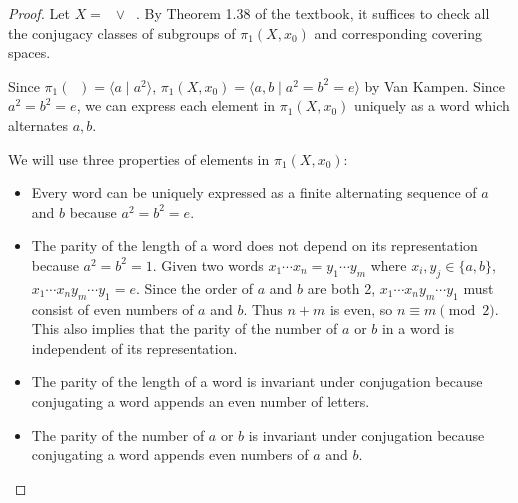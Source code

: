 \documentclass[12pt, psamsfonts]{amsart}
\theoremstyle{definition}
\theoremstyle{remark}
\DeclareMathOperator{\RP}{\mathbb{R}\mathbf{P}^2}
\numberwithin{equation}{section}
\begin{document}
\begin{proof}
  Let $X = \RP \vee \RP$.
  By Theorem 1.38 of the textbook, it suffices to check all the conjugacy classes of subgroups of $\pi_1(X, x_0)$ and corresponding covering spaces.

  Since $\pi_1(\RP) = \langle a \mid a^2 \rangle$, $\pi_1(X, x_0) = \langle a, b \mid a^2 = b^2 = e \rangle$ by Van Kampen.
  Since $a^2 = b^2 = e$, we can express each element in $\pi_1(X, x_0)$ uniquely as a word which alternates $a, b$.

  We will use three properties of elements in $\pi_1(X, x_0)$:

  \begin{itemize}
    \item
      Every word can be uniquely expressed as a finite alternating sequence of $a$ and $b$ because $a^2 = b^2 = e$.
    \item
      The parity of the length of a word does not depend on its representation because $a^2 = b^2 = 1$.
      Given two words $x_1 \cdots x_n = y_1 \cdots y_m$ where $x_i, y_j \in \{ a, b \}$, $x_1 \cdots x_n y_m \cdots y_1 = e$.
      Since the order of $a$ and $b$ are both 2, $x_1 \cdots x_n y_m \cdots y_1$ must consist of even numbers of $a$ and $b$.
      Thus $n + m$ is even, so $n \equiv m \pmod 2$.
      This also implies that the parity of the number of $a$ or $b$ in a word is independent of its representation.
    \item
      The parity of the length of a word is invariant under conjugation because conjugating a word appends an even number of letters.
    \item
      The parity of the number of $a$ or $b$ is invariant under conjugation because conjugating a word appends even numbers of $a$ and $b$.
  \end{itemize}


\end{proof}
\end{document}
